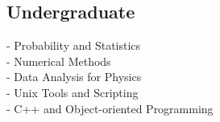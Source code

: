 \documentclass[letterpaper]{deedy-resume} %
\begin{document}
\begin{minipage}[t]{0.29\textwidth}

\subsection{Undergraduate}

- Probability and Statistics \\
- Numerical Methods \\
- Data Analysis for Physics \\
- Unix Tools and Scripting \\
- C++ and Object-oriented Programming \\



\end{minipage} %
\hfill
%
%
\end{document}
